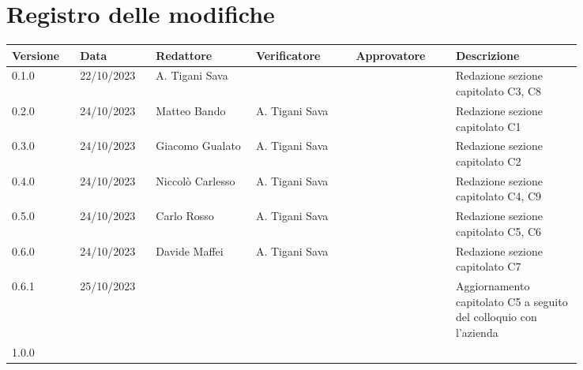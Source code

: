 \section{Registro delle modifiche}
{
\renewcommand{\arraystretch}{1.5}
\scriptsize
\begin{tabular}{p{0.10\linewidth}p{0.10\linewidth}p{0.15\linewidth}p{0.15\linewidth}p{0.15\linewidth}p{0.19\linewidth}}
    \textbf{Versione}   & \textbf{Data} & \textbf{Redattore}    & \textbf{Verificatore} & \textbf{Approvatore}  & \textbf{Descrizione}  \\
    \hline
    0.1.0               & 22/10/2023    & A. Tigani Sava        &                       &                       & Redazione sezione capitolato C3, C8  	\\
    0.2.0               & 24/10/2023    & Matteo Bando          & A. Tigani Sava		&                       & Redazione sezione capitolato C1		\\
    0.3.0               & 24/10/2023    & Giacomo Gualato       & A. Tigani Sava		&                       & Redazione sezione capitolato C2		\\
    0.4.0               & 24/10/2023    & Niccolò Carlesso      & A. Tigani Sava		&                       & Redazione sezione capitolato C4, C9  	\\
    0.5.0               & 24/10/2023    & Carlo Rosso           & A. Tigani Sava		&                       & Redazione sezione capitolato C5, C6  	\\
    0.6.0               & 24/10/2023    & Davide Maffei         & A. Tigani Sava		&                       & Redazione sezione capitolato C7     	\\
    0.6.1               & 25/10/2023    &                       & 		                &                       & Aggiornamento capitolato C5 a seguito del colloquio con l'azienda   	\\
    1.0.0 \\
    \hline
\end{tabular}
}